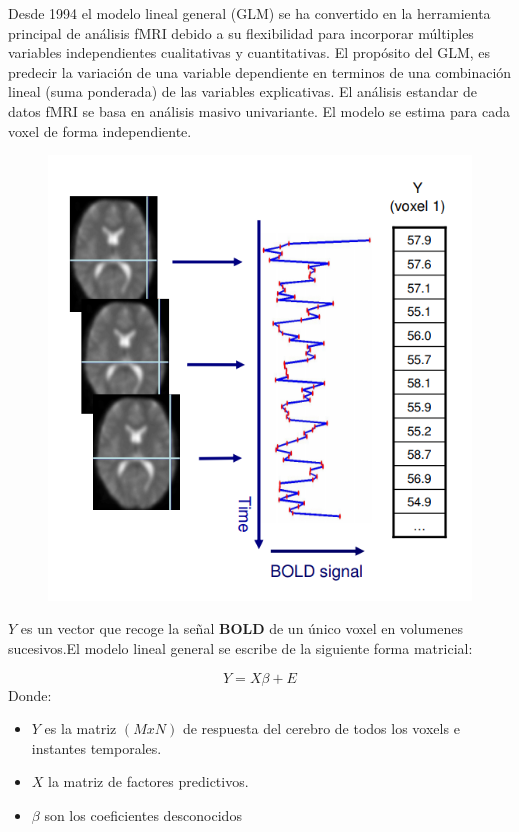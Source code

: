  Desde 1994 el modelo lineal general (GLM) se ha convertido en la herramienta principal de análisis fMRI debido a su flexibilidad para incorporar múltiples variables independientes cualitativas y cuantitativas. El propósito del GLM, es predecir la variación de una variable dependiente en terminos de una combinación lineal (suma ponderada) de las variables explicativas. El análisis estandar de datos fMRI se basa en análisis masivo univariante. El modelo se estima para cada voxel de forma independiente.
 
 	\begin{figure}[H]
  		\centering
    	\includegraphics[scale=0.5]{img/glm.png}
  		\caption{}         \label{preproc:glm}
	\end{figure}
	

$Y$ es un vector que recoge la señal \textbf{BOLD} de un único voxel en volumenes sucesivos.El modelo lineal general se escribe de la siguiente forma matricial:

	$$Y=X \beta+E$$
Donde:
\begin{itemize}
	\item $Y$ es la matriz $(MxN)$ de respuesta del cerebro de todos los voxels e instantes temporales.
	\item $X$ la matriz de factores predictivos.
	\item $\beta$ son los coeficientes desconocidos
\end{itemize}

